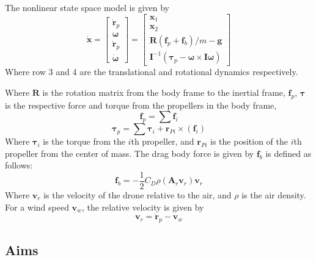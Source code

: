 \documentclass{article}
\begin{document}
The nonlinear state space model is given by
\begin{equation}
    \mathbf{\dot{x}} = \begin{bmatrix}
        \mathbf{\dot{r}}_p \\
        \boldsymbol{\omega} \\
        \mathbf{\dot{r}}_p \\
        \boldsymbol{\dot{\omega}}
    \end{bmatrix} = \begin{bmatrix}
        \mathbf{x}_1 \\
        \mathbf{x}_2 \\
        \mathbf{R}(\mathbf{f}_p + \mathbf{f}_b) / m - \mathbf{g} \\
        \mathbf{I}^{-1} (\boldsymbol{\tau}_p - \boldsymbol{\omega} \times \mathbf{I} \boldsymbol{\omega})
    \end{bmatrix}
\end{equation}
Where row 3 and 4 are the translational and rotational dynamics respectively.

Where $\mathbf{R}$ is the rotation matrix from the body frame to the inertial frame,
$\mathbf{f}_p$, $\boldsymbol{\tau}$ is the respective force and torque from the propellers in the body frame,
\begin{equation}
    \mathbf{f}_p = \sum{\mathbf{f}_i}
\end{equation}
\begin{equation}
    \boldsymbol{\tau}_p = \sum{\boldsymbol{\tau}_i + \mathbf{r}_{Pi} \times (\mathbf{f}_i)}
\end{equation}
Where $\boldsymbol{\tau}_i$ is the torque from the $i$th propeller, and $\mathbf{r}_{Pi}$ is the position of the $i$th propeller from the center of mass.
The drag body force is given by $\mathbf{f}_b$ is defined as follows:
\begin{equation}
    \mathbf{f}_b = -\frac{1}{2} C_D \rho (\mathbf{A}_r \mathbf{v}_r ) \mathbf{v}_r
\end{equation}
Where $\mathbf{v}_r$ is the velocity of the drone relative to the air, and $\rho$ is the air density.
For a wind speed $\mathbf{v}_w$, the relative velocity is given by
\begin{equation}
    \mathbf{v}_r = \mathbf{\dot{r}}_p - \mathbf{v}_w
\end{equation}

\subsection{Aims}
\end{document}
